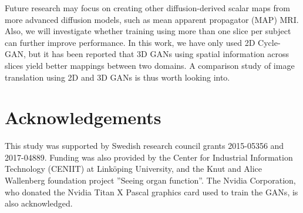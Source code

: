 \documentclass{article}
\begin{document}
Future research may focus on creating other diffusion-derived scalar maps from more advanced diffusion models, such as mean apparent propagator (MAP) MRI. Also, we will investigate whether training using more than one slice per subject can further improve performance. In this work, we have only used 2D Cycle-GAN, but it has been reported that 3D GANs using spatial information \cite{nie2017medical} across slices yield better mappings between two domains. A comparison study of image translation using 2D and 3D GANs is thus worth looking into.


\section*{Acknowledgements}

This study was supported by Swedish research council grants 2015-05356 and 2017-04889. Funding was also provided by the Center for Industrial Information Technology (CENIIT) at Linköping University, and the Knut and Alice Wallenberg foundation project ”Seeing organ function”. The Nvidia Corporation, who donated the Nvidia Titan X Pascal graphics card used to train the GANs, is also acknowledged.

\vfill
\pagebreak




\end{document}
